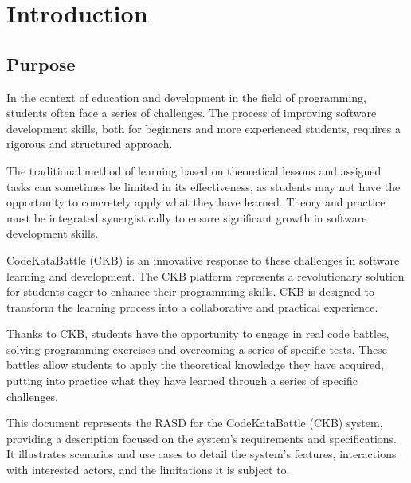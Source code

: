 \section{Introduction}\label{intro}
\subsection{Purpose}
In the context of education and development in the field of programming, students often face a series of challenges. The process of improving software development skills, both for beginners and more experienced students, requires a rigorous and structured approach.\newline

\noindent The traditional method of learning based on theoretical lessons and assigned tasks can sometimes be limited in its effectiveness, as students may not have the opportunity to concretely apply what they have learned. Theory and practice must be integrated synergistically to ensure significant growth in software development skills.
\newline

\noindent CodeKataBattle (CKB) is an innovative response to these challenges in software learning and development. The CKB platform represents a revolutionary solution for students eager to enhance their programming skills. CKB is designed to transform the learning process into a collaborative and practical experience.
\newline

\noindent Thanks to CKB, students have the opportunity to engage in real code battles, solving programming exercises and overcoming a series of specific tests. These battles allow students to apply the theoretical knowledge they have acquired, putting into practice what they have learned through a series of specific challenges.
\newline

\noindent This document represents the RASD for the CodeKataBattle (CKB) system, providing a description focused on the system's requirements and specifications. It illustrates scenarios and use cases to detail the system's features, interactions with interested actors, and the limitations it is subject to.

